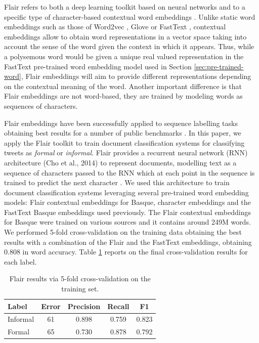 \documentclass[information,article,submit,moreauthors,pdftex,10pt,a4paper]{Definitions/mdpi}
\begin{document}
Flair refers to both a deep learning toolkit based on neural networks and to a specific type of character-based contextual word embeddings \cite{akbik2018contextual}. Unlike static word embeddings such as those of Word2vec \cite{mikolov2013distributed}, Glove \cite{pennington-etal-2014-glove} or FastText \cite{mikolov-etal-2018-advances}, contextual embeddings allow to obtain word representations in a vector space taking into account the sense of the word given the context in which it appears. Thus, while a polysemous word would be given a unique real valued representation in the FastText pre-trained word embedding model used in Section \ref{sec:pre-trained-word}, Flair embeddings will aim to provide different representations depending on the contextual meaning of the word. Another important difference is that Flair embeddings are not word-based, they are trained by modeling words as sequences of characters.

Flair embeddings have been successfully applied to sequence labelling tasks obtaining best results for a number of public benchmarks \cite{akbik2018contextual}. In this paper, we apply the Flair toolkit to train document classification systems for classifying tweets as \emph{formal} or \emph{informal}. Flair provides a recurrent neural network (RNN) architecture (Cho et al., 2014) to represent documents, modelling text as a sequence of characters passed to the RNN which at each point in the sequence is trained to predict the next character \cite{akbik2018contextual}. We used this architecture to train document classification systems leveraging several pre-trained word embedding models: Flair contextual embeddings for Basque, character embeddings and the FastText Basque embeddings used previously. The Flair contextual embeddings for Basque were trained on various sources and it contains around 249M words. We performed 5-fold cross-validation on the training data obtaining the best results with a combination of the Flair and the FastText embeddings, obtaining 0.808 in word accuracy. Table \ref{tab:flair} reports on the final cross-validation results for each label.

\begin{table}[H]
  \centering
  \begin{tabular}{lcccc}
    \hline
    Label & Error & Precision & Recall & F1 \\ \hline \hline
    Informal & 61 & 0.898 & 0.759  & 0.823 \\
    Formal & 65 & 0.730 & 0.878 & 0.792 \\ \hline
  \end{tabular}
  \caption{Flair results via 5-fold cross-validation on the training set.}
  \label{tab:flair}
\end{table}
\end{document}

